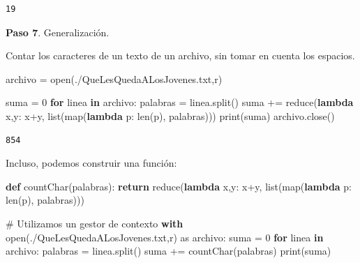 \documentclass[
  spanish,
  letterpaper,
]{scrbook}
\newenvironment{Shaded}{\begin{snugshade}}{\end{snugshade}}
\newcommand{\BuiltInTok}[1]{\textcolor[rgb]{0.00,0.23,0.31}{#1}}
\newcommand{\CommentTok}[1]{\textcolor[rgb]{0.37,0.37,0.37}{#1}}
\newcommand{\ControlFlowTok}[1]{\textcolor[rgb]{0.00,0.23,0.31}{\textbf{#1}}}
\newcommand{\DecValTok}[1]{\textcolor[rgb]{0.68,0.00,0.00}{#1}}
\newcommand{\ImportTok}[1]{\textcolor[rgb]{0.00,0.46,0.62}{#1}}
\newcommand{\KeywordTok}[1]{\textcolor[rgb]{0.00,0.23,0.31}{\textbf{#1}}}
\newcommand{\NormalTok}[1]{\textcolor[rgb]{0.00,0.23,0.31}{#1}}
\newcommand{\OperatorTok}[1]{\textcolor[rgb]{0.37,0.37,0.37}{#1}}
\newcommand{\StringTok}[1]{\textcolor[rgb]{0.13,0.47,0.30}{#1}}
\theoremstyle{definition}
\theoremstyle{remark}
\begin{document}
\begin{verbatim}
19
\end{verbatim}

\textbf{Paso 7}. Generalización.

Contar los caracteres de un texto de un archivo, sin tomar en cuenta los
espacios.

\begin{Shaded}
\begin{Highlighting}[]
\NormalTok{archivo }\OperatorTok{=} \BuiltInTok{open}\NormalTok{(}\StringTok{\textquotesingle{}./QueLesQuedaALosJovenes.txt\textquotesingle{}}\NormalTok{,}\StringTok{\textquotesingle{}r\textquotesingle{}}\NormalTok{)}

\NormalTok{suma }\OperatorTok{=} \DecValTok{0}
\ControlFlowTok{for}\NormalTok{ linea }\KeywordTok{in}\NormalTok{ archivo:}
\NormalTok{    palabras }\OperatorTok{=}\NormalTok{ linea.split()}
\NormalTok{    suma }\OperatorTok{+=} \BuiltInTok{reduce}\NormalTok{(}\KeywordTok{lambda}\NormalTok{ x,y: x}\OperatorTok{+}\NormalTok{y, }\BuiltInTok{list}\NormalTok{(}\BuiltInTok{map}\NormalTok{(}\KeywordTok{lambda}\NormalTok{ p: }\BuiltInTok{len}\NormalTok{(p), palabras)))}
\BuiltInTok{print}\NormalTok{(suma)}
\NormalTok{archivo.close()}
\end{Highlighting}
\end{Shaded}

\begin{verbatim}
854
\end{verbatim}

Incluso, podemos construir una función:

\begin{Shaded}
\begin{Highlighting}[]
\KeywordTok{def}\NormalTok{ countChar(palabras):}
    \ControlFlowTok{return} \BuiltInTok{reduce}\NormalTok{(}\KeywordTok{lambda}\NormalTok{ x,y: x}\OperatorTok{+}\NormalTok{y, }\BuiltInTok{list}\NormalTok{(}\BuiltInTok{map}\NormalTok{(}\KeywordTok{lambda}\NormalTok{ p: }\BuiltInTok{len}\NormalTok{(p), palabras)))}
\end{Highlighting}
\end{Shaded}

\begin{Shaded}
\begin{Highlighting}[]
\CommentTok{\# Utilizamos un gestor de contexto}
\ControlFlowTok{with} \BuiltInTok{open}\NormalTok{(}\StringTok{\textquotesingle{}./QueLesQuedaALosJovenes.txt\textquotesingle{}}\NormalTok{,}\StringTok{\textquotesingle{}r\textquotesingle{}}\NormalTok{) }\ImportTok{as}\NormalTok{ archivo:}
\NormalTok{    suma }\OperatorTok{=} \DecValTok{0}
    \ControlFlowTok{for}\NormalTok{ linea }\KeywordTok{in}\NormalTok{ archivo:}
\NormalTok{        palabras }\OperatorTok{=}\NormalTok{ linea.split()}
\NormalTok{        suma }\OperatorTok{+=}\NormalTok{ countChar(palabras)}
    \BuiltInTok{print}\NormalTok{(suma)}
\end{Highlighting}
\end{Shaded}
\end{document}
